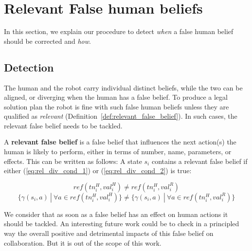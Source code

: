\section{Relevant False human beliefs}

In this section, we explain our procedure to detect \textit{when} a false human belief should be corrected and \textit{how}.


    \subsection{Detection}

The human and the robot carry individual distinct beliefs, while the two can be aligned, or diverging when the human has a false belief. To produce a legal solution plan the robot is fine with such false human beliefs unless they are qualified as \textit{relevant} (Definition~\ref{def:relevant_false_belief}). In such cases, the relevant false belief needs to be tackled.

\begin{definition} \label{def:relevant_false_belief}

A \textbf{relevant false belief} is a false belief that influences the next action(s) the human is likely to perform, either in terms of number, name, parameters, or effects. This can be written as follows:
A state $s_i$ contains a relevant false belief if either (\ref{eq:rel_div_cond_1}) or (\ref{eq:rel_div_cond_2}) is true:

\begin{equation} \label{eq:rel_div_cond_1}
ref(tn^H_i, val^H_i) \neq ref(tn^H_i, val^R_i)
\end{equation}
\begin{equation} \label{eq:rel_div_cond_2}
\{ \gamma(s_i,a) ~|~ \forall a \in ref( tn^H_i, val^H_i ) \} \neq \{ \gamma(s_i,a) ~|~ \forall a \in ref( tn^H_i, val^R_i ) \}
\end{equation}
\end{definition}

We consider that as soon as a false belief has an effect on human actions it should be tackled. An interesting future work could  be to check in a principled way the overall positive and detrimental impacts of this false belief on collaboration. But it is out of the scope of this work.

